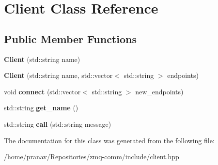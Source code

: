 \hypertarget{classClient}{}\section{Client Class Reference}
\label{classClient}
\subsection*{Public Member Functions}
\begin{DoxyCompactItemize}
\item 
{\bfseries Client} (std\+::string name)\hypertarget{classClient_a3155b89414f2f61ec50d1ba639aa2611}{}\label{classClient_a3155b89414f2f61ec50d1ba639aa2611}

\item 
{\bfseries Client} (std\+::string name, std\+::vector$<$ std\+::string $>$ endpoints)\hypertarget{classClient_a5920215827fbf2dd09f37dddc573d5c9}{}\label{classClient_a5920215827fbf2dd09f37dddc573d5c9}

\item 
void {\bfseries connect} (std\+::vector$<$ std\+::string $>$ new\+\_\+endpoints)\hypertarget{classClient_a24feacb5cf3e55549586fd7b3b3827da}{}\label{classClient_a24feacb5cf3e55549586fd7b3b3827da}

\item 
std\+::string {\bfseries get\+\_\+name} ()\hypertarget{classClient_a159e477ab6a0f0d7e77e5a4426d7de78}{}\label{classClient_a159e477ab6a0f0d7e77e5a4426d7de78}

\item 
std\+::string {\bfseries call} (std\+::string message)\hypertarget{classClient_a5e980004675cbbd1a8b37caf26508ecd}{}\label{classClient_a5e980004675cbbd1a8b37caf26508ecd}

\end{DoxyCompactItemize}


The documentation for this class was generated from the following file\+:\begin{DoxyCompactItemize}
\item 
/home/pranav/\+Repositories/zmq-\/comm/include/client.\+hpp\end{DoxyCompactItemize}
